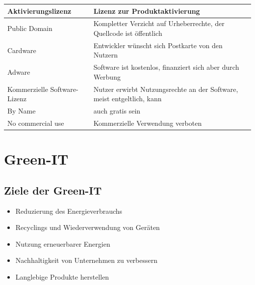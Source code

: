 \documentclass[a4paper]{article}
\begin{document}
\begin{center}
\begin{tabular}{|l|l|}
            {\color[HTML]{CB0000} Aktivierungslizenz}                    & {\color[HTML]{3166FF} Lizenz zur Produktaktivierung}                                          \\ \hline
            {\color[HTML]{CB0000} Public Domain}                         & {\color[HTML]{3166FF} Kompletter Verzicht auf Urheberrechte, der Quellcode ist öffentlich}    \\ \hline
            {\color[HTML]{CB0000} Cardware}                              & {\color[HTML]{3166FF} Entwickler wünscht sich Postkarte von den Nutzern}                      \\ \hline
            {\color[HTML]{CB0000} Adware}                                & {\color[HTML]{3166FF} Software ist kostenlos, finanziert sich aber durch Werbung}             \\ \hline
            {\color[HTML]{CB0000} Kommerzielle Software-Lizenz}          & {\color[HTML]{3166FF} Nutzer erwirbt Nutzungsrechte an der Software, meist entgeltlich, kann} \\ \hline
            {\color[HTML]{CB0000} By Name}                               & {\color[HTML]{3166FF} auch gratis sein}                                                       \\ \hline
            {\color[HTML]{CB0000} No commercial use}                     & {\color[HTML]{3166FF} Kommerzielle Verwendung verboten}                                       \\ \hline
        \end{tabular}
    \end{center}

    \section{Green-IT}\label{sec:green-it}
    \subsection{\color{red}Ziele der Green-IT}\label{subsec:ziele-der-green-it}
        \begin{itemize}
            \color{magenta}
            \item Reduzierung des Energieverbrauchs
            \item Recyclings und Wiederverwendung
            von Geräten
            \item Nutzung erneuerbarer Energien
            \item Nachhaltigkeit von Unternehmen zu
            verbessern
            \item Langlebige Produkte herstellen
        \end{itemize}
\end{document}
